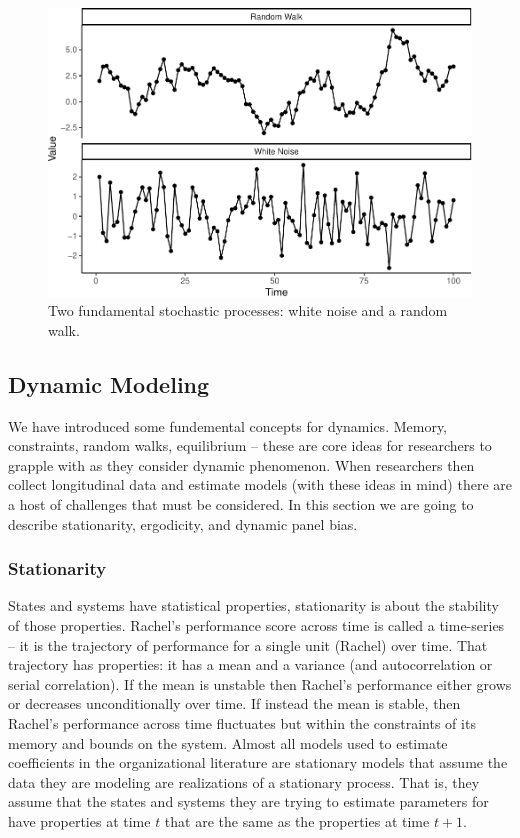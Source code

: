 \documentclass[english,,man]{apa6}
\theoremstyle{definition}
\theoremstyle{definition}
\theoremstyle{definition}
\theoremstyle{remark}
\begin{document}
\begin{figure}
\centering
\includegraphics{figs/unnamed-chunk-10-1.pdf}
\caption{\label{fig:unnamed-chunk-10}Two fundamental stochastic processes:
white noise and a random walk.\label{noise}}
\end{figure}

\hypertarget{dynamic-modeling}{%
\subsection{Dynamic Modeling}\label{dynamic-modeling}}

We have introduced some fundemental concepts for dynamics. Memory,
constraints, random walks, equilibrium -- these are core ideas for
researchers to grapple with as they consider dynamic phenomenon. When
researchers then collect longitudinal data and estimate models (with
these ideas in mind) there are a host of challenges that must be
considered. In this section we are going to describe stationarity,
ergodicity, and dynamic panel bias.

\hypertarget{stationarity}{%
\subsubsection{Stationarity}\label{stationarity}}

States and systems have statistical properties, stationarity is about
the stability of those properties. Rachel's performance score across
time is called a time-series -- it is the trajectory of performance for
a single unit (Rachel) over time. That trajectory has properties: it has
a mean and a variance (and autocorrelation or serial correlation). If
the mean is unstable then Rachel's performance either grows or decreases
unconditionally over time. If instead the mean is stable, then Rachel's
performance across time fluctuates but within the constraints of its
memory and bounds on the system. Almost all models used to estimate
coefficients in the organizational literature are stationary models that
assume the data they are modeling are realizations of a stationary
process. That is, they assume that the states and systems they are
trying to estimate parameters for have properties at time \(t\) that are
the same as the properties at time \(t + 1\).
\end{document}

